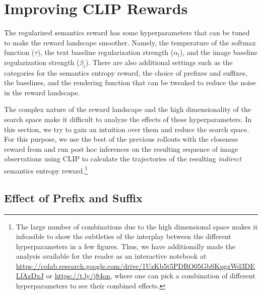 
\section{Improving CLIP Rewards}
\label{sec:improving-rewards}

The regularized semantics reward has some hyperparameters that can be tuned to make the reward landscape smoother.
Namely, the temperature of the softmax function (\(\tau\)), the text baseline regularization strength (\(\alpha_{l}\)), and the image baseline regularization strength (\(\beta_{i}\)).
There are also additional settings such as the categories for the semantics entropy reward, the choice of prefixes and suffixes, the baselines, and the rendering function that can be tweaked to reduce the noise in the reward landscape.

The complex nature of the reward landscape and the high dimensionality of the search space make it difficult to analyze the effects of these hyperparameters.
In this section, we try to gain an intuition over them and reduce the search space.
For this purpose, we use the best of the previous rollouts with the closeness reward from  and run post hoc inferences on the resulting sequence of image observations using CLIP to calculate the trajectories of the resulting \emph{indirect} semantics entropy reward.\footnote{The large number of combinations due to the high dimensional space makes it infeasible to show the subtleties of the interplay between the different hyperparameters in a few figures.
Thus, we have additionally made the analysis available for the reader as an interactive notebook at \url{https://colab.research.google.com/drive/1UzKb5t5PDRO05GbSKpgzWd3DELfAzDxJ} or \url{https://t.ly/j84on}, where one can pick a combination of different hyperparameters to see their combined effects.}

\subsection{Effect of Prefix and Suffix}
\label{sec:prefix-suffix}

